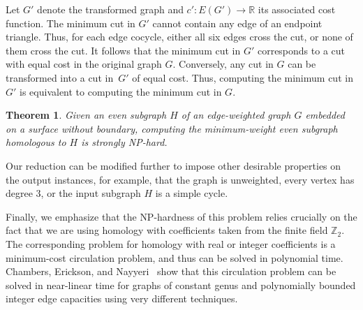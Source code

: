 \documentclass[11pt,twoside]{article}
\def\Z{\mathbb{Z}}
\def\Real{\mathbb{R}}
\newtheorem{theorem}{Theorem}[section]
\begin{document}
{Let $G'$ denote the transformed graph and $c'\colon E(G')\to \Real$ its associated cost function.  The minimum cut in $G'$ cannot contain any edge of an endpoint triangle.  Thus, for each edge cocycle, either all six edges cross the cut, or none of them cross the cut.  It follows that the minimum cut in $G'$ corresponds to a cut with equal cost in the original graph $G$.  Conversely, any cut in $G$ can be transformed into a cut in~$G'$ of equal cost.  Thus, computing the minimum cut in $G'$ is equivalent to computing the minimum cut in $G$.

\begin{theorem}
Given an even subgraph $H$ of an edge-weighted graph $G$ embedded on a surface without boundary, computing the minimum-weight even subgraph homologous to $H$ is strongly {NP}-hard.
\end{theorem}

Our reduction can be modified further to impose other desirable properties on the output instances, for example, that the graph is unweighted, every vertex has degree $3$, or the input subgraph $H$ is a simple cycle.

Finally, we emphasize that the {NP}-hardness of this problem relies crucially on the fact that we are using homology with coefficients taken from the finite field $\Z_2$.  The corresponding problem for homology with real or integer coefficients is a minimum-cost circulation problem, and thus can be solved in polynomial time.
Chambers, Erickson, and Nayyeri~\cite{cen-hfcc-12} show that this circulation problem can be solved in near-linear time for graphs of constant genus and polynomially bounded integer edge capacities using very different techniques.


\def\minSS{X}

}
\end{document}
